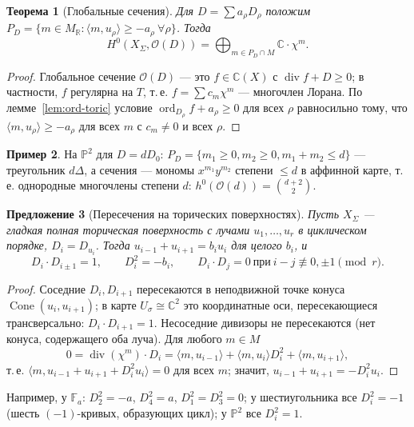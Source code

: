 \documentclass[11pt,a4paper]{article}
\theoremstyle{plain}
\newtheorem{theorem}{Теорема}[section]
\newtheorem{proposition}[theorem]{Предложение}
\theoremstyle{definition}
\newtheorem{example}[theorem]{Пример}
\theoremstyle{remark}
\renewcommand{\C}{\mathbb{C}}
\newcommand{\R}{\mathbb{R}}
\newcommand{\PP}{\mathbb{P}}
\newcommand{\cO}{\mathcal{O}}
\DeclareMathOperator{\divv}{div}
\DeclareMathOperator{\ord}{ord}
\DeclareMathOperator{\Cone}{Cone}
\begin{document}
\begin{theorem}[Глобальные сечения]\label{thm:toric-sections}
Для $D=\sum a_\rho D_\rho$ положим $P_D=\{m\in M_\R:\langle m,u_\rho\rangle\ge-a_\rho\ \forall\rho\}$. Тогда
\[
H^0(X_\Sigma,\cO(D))=\bigoplus_{m\in P_D\cap M}\C\cdot\chi^m .
\]
\end{theorem}
\begin{proof}
Глобальное сечение $\cO(D)$ --- это $f\in\C(X)$ с $\divv f+D\ge0$; в частности, $f$ регулярна на $T$,
т.\,е. $f=\sum c_m\chi^m$ --- многочлен Лорана. По лемме~\ref{lem:ord-toric} условие
$\ord_{D_\rho}f+a_\rho\ge0$ для всех $\rho$ равносильно тому, что $\langle m,u_\rho\rangle\ge-a_\rho$ для
всех $m$ с $c_m\ne0$ и всех $\rho$.
\end{proof}

\begin{example}
На $\PP^2$ для $D=dD_0$: $P_D=\{m_1\ge0,m_2\ge0,m_1+m_2\le d\}$ --- треугольник $d\Delta$, а
сечения --- мономы $x^{m_1}y^{m_2}$ степени $\le d$ в аффинной карте, т.\,е. однородные многочлены
степени $d$: $h^0(\cO(d))=\binom{d+2}2$.
\end{example}

\begin{proposition}[Пересечения на торических поверхностях]\label{prop:toric-surf}
Пусть $X_\Sigma$ --- гладкая полная торическая поверхность с лучами $u_1,\dots,u_r$ в циклическом
порядке, $D_i=D_{u_i}$. Тогда $u_{i-1}+u_{i+1}=b_iu_i$ для целого $b_i$, и
\[
D_i\cdot D_{i\pm1}=1,\qquad D_i^2=-b_i,\qquad D_i\cdot D_j=0\ \text{при}\ i-j\not\equiv0,\pm1\!\!\pmod r.
\]
\end{proposition}
\begin{proof}
Соседние $D_i,D_{i+1}$ пересекаются в неподвижной точке конуса $\Cone(u_i,u_{i+1})$; в карте
$U_\sigma\cong\C^2$ это координатные оси, пересекающиеся трансверсально: $D_i\cdot D_{i+1}=1$.
Несоседние дивизоры не пересекаются (нет конуса, содержащего оба луча). Для любого $m\in M$
\[
0=\divv(\chi^m)\cdot D_i=\langle m,u_{i-1}\rangle+\langle m,u_i\rangle D_i^2+\langle m,u_{i+1}\rangle,
\]
т.\,е. $\langle m,u_{i-1}+u_{i+1}+D_i^2u_i\rangle=0$ для всех $m$; значит, $u_{i-1}+u_{i+1}=-D_i^2u_i$.
\end{proof}

Например, у $\mathbb F_a$: $D_2^2=-a$, $D_4^2=a$, $D_1^2=D_3^2=0$; у шестиугольника все $D_i^2=-1$
(шесть $(-1)$-кривых, образующих цикл); у $\PP^2$ все $D_i^2=1$.
\end{document}
